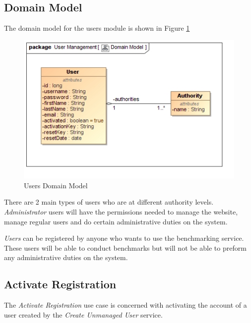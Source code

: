 \subsection{Domain Model}
The domain model for the users module is shown in Figure \ref{Users Domain Model}
\begin{figure}[H]
  \begin{center}
  \includegraphics[scale=0.4]{../Diagrams and Charts/User Management/Domain Model.jpg}
  \caption{Users Domain Model}
  \end{center}
  \label{Users Domain Model}
\end{figure}

There are 2 main types of users who are at different authority levels. 
\textit{Administrator} users will have the permissions needed to manage the 
website, manage regular users and do certain administrative duties on the
system.

\textit{Users} can be registered by anyone who wants to use the benchmarking 
service. These users will be able to conduct benchmarks but will not be able to
preform any administrative duties on the system.



\subsection{Activate Registration}
The \textit{Activate Registration} use case is concerned with activating the
account of a user created by the \textit{Create Unmanaged User} service.

